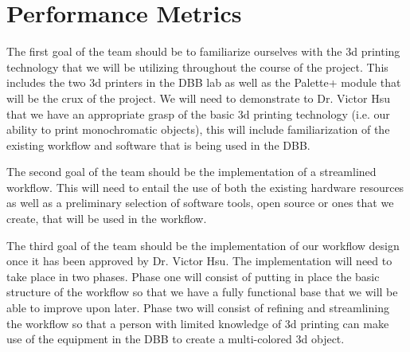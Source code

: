 \documentclass[letterpaper, onecolumn, draftclsnofoot, 10pt, compsoc]{IEEEtran}
\begin{document}
\section{Performance Metrics}
    \begin{singlespace}
        The first goal of the team should be to familiarize ourselves with the 3d printing technology that we will be utilizing throughout the course of the project. This includes the two 3d printers in the DBB lab as well as the Palette+ module that will be the crux of the project. We will need to demonstrate to Dr. Victor Hsu that we have an appropriate grasp of the basic 3d printing technology (i.e. our ability to print monochromatic objects), this will include familiarization of the existing workflow and software that is being used in the DBB.\par
        The second goal of the team should be the implementation of a streamlined workflow. This will need to entail the use of both the existing hardware resources as well as a preliminary selection of software tools, open source or ones that we create, that will be used in the workflow.\par
        The third goal of the team should be the implementation of our workflow design once it has been approved by Dr. Victor Hsu. The implementation will need to take place in two phases. Phase one will consist of putting in place the basic structure of the workflow so that we have a fully functional base that we will be able to improve upon later. Phase two will consist of refining and streamlining the workflow so that a person with limited knowledge of 3d printing can make use of the equipment in the DBB to create a multi-colored 3d object.\par 
    \end{singlespace}
\end{document}
